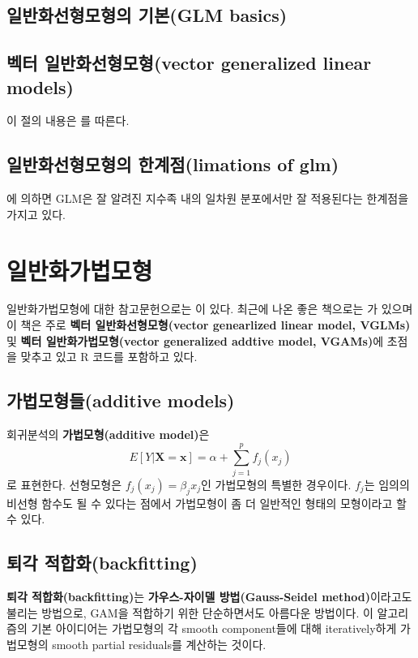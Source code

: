 \documentclass[b5paper,]{scrbook}
\theoremstyle{plain}
\theoremstyle{definition}
\numberwithin{equation}{section}
\begin{document}
\section{일반화선형모형의 기본(GLM basics)}\label{-glm-basics}

\section{벡터 일반화선형모형(vector generalized linear
models)}\label{-vector-generalized-linear-models}

이 절의 내용은 \citep{Yee2015}를 따른다.

\section{일반화선형모형의 한계점(limations of
glm)}\label{-limations-of-glm}

\citep{Yee2015}에 의하면 GLM은 잘 알려진 지수족 내의 일차원 분포에서만
잘 적용된다는 한계점을 가지고 있다.

\chapter{일반화가법모형}\label{gam}

일반화가법모형에 대한 참고문헌으로는 \citep{Wood2006}이 있다. 최근에
나온 좋은 책으로는 \citep{Yee2015}가 있으며 이 책은 주로 \textbf{벡터
일반화선형모형(vector genearlized linear model, VGLMs)} 및 \textbf{벡터
일반화가법모형(vector generalized addtive model, VGAMs)}에 초점을 맞추고
있고 R 코드를 포함하고 있다.

\section{가법모형들(additive models)}\label{additive-models}

회귀분석의 \textbf{가법모형(additive model)}은
\[E[Y|\mathbf{X}=\mathbf{x}]=\alpha+\sum_{j=1}^{p}f_{j}(x_j)\] 로
표현한다. 선형모형은 \(f_{j}(x_{j})=\beta_{j}x_{j}\)인 가법모형의 특별한
경우이다. \(f_{j}\)는 임의의 비선형 함수도 될 수 있다는 점에서
가법모형이 좀 더 일반적인 형태의 모형이라고 할 수 있다.

\section{퇴각 적합화(backfitting)}\label{-backfitting}

\textbf{퇴각 적합화(backfitting)}는 \textbf{가우스-자이델
방법(Gauss-Seidel method)}이라고도 불리는 방법으로, GAM을 적합하기 위한
단순하면서도 아름다운 방법이다. 이 알고리즘의 기본 아이디어는 가법모형의
각 smooth component들에 대해 iteratively하게 가법모형의 smooth partial
residuals를 계산하는 것이다.
\end{document}
